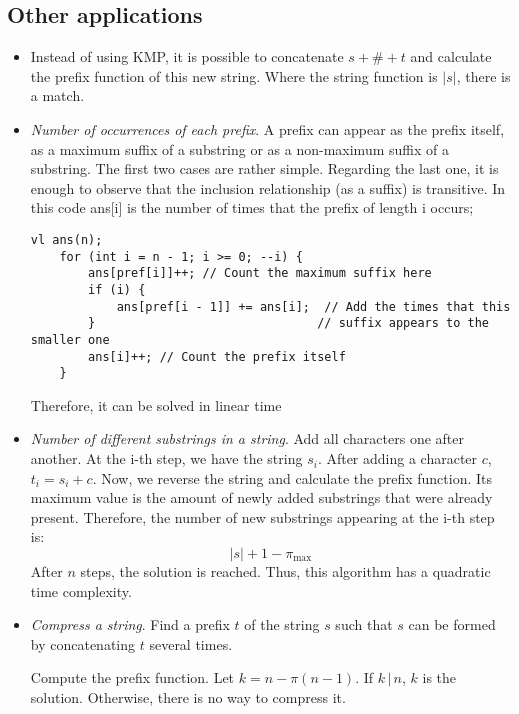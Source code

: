 \subsection{Other applications}
\begin{itemize}
		\item Instead of using KMP, it is possible to concatenate $s + \# + t$
				and calculate the prefix function of this new string. Where
				the string function is $|s|$, there is a match.
		\item \textit{Number of occurrences of each prefix}. A prefix can appear
				as the prefix itself, as a maximum suffix of a substring or as
				a non-maximum suffix of a substring. The first two cases
				are rather simple. Regarding the last one, it is enough to 
				observe that the inclusion relationship (as a suffix) is
				transitive. In this code ans[i] is the number of times that 
				the prefix of length i occurs;
\begin{verbatim}
vl ans(n);
    for (int i = n - 1; i >= 0; --i) {
		ans[pref[i]]++; // Count the maximum suffix here
        if (i) {
            ans[pref[i - 1]] += ans[i];  // Add the times that this 
		}							    // suffix appears to the smaller one
		ans[i]++; // Count the prefix itself
    }
\end{verbatim}
Therefore, it can be solved in linear time

		\item  \textit{Number of different substrings in a string}. Add all
				characters one after another. At the i-th step, we have the
				string $s_i$. After adding  a character $c$, $t_i=s_i + c$.
				Now, we reverse the string and calculate the prefix function.
				Its maximum value is the amount of newly added substrings 
				that were already present. Therefore, the number of
				new substrings appearing at the i-th step is:
				\[
						|s|+1-\pi_{\text{max}}
				\]
				After $n$ steps, the solution is reached. Thus, this algorithm
				has a quadratic time complexity.
		\item \textit{Compress a string}. Find a prefix  $t$ of the string $s$
				such that $s$ can be formed by concatenating $t$ several times.

				Compute the prefix function. Let $k=n-\pi(n-1)$. If $k\,|\,n$, 
				$k$ is the solution. Otherwise, there is no way to compress it.

\end{itemize}

\newpage
